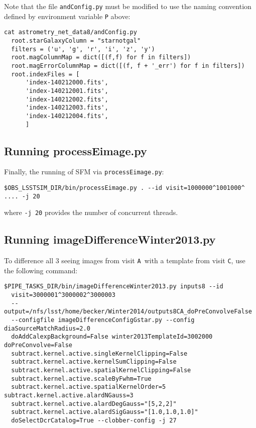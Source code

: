 \documentclass[prd, nofootinbib, floatfix, 11pt, tightenlines, times]{article}
\def\A{{\tt A}}
\def\C{{\tt C}}
\begin{document}
\begin{appendices}
Note that the file {\tt andConfig.py} must be modified to use the
naming convention defined by environment variable {\tt P} above:

{\small
\begin{Verbatim}[frame=single]
cat astrometry_net_data8/andConfig.py 
  root.starGalaxyColumn = "starnotgal"
  filters = ('u', 'g', 'r', 'i', 'z', 'y')
  root.magColumnMap = dict([(f,f) for f in filters])
  root.magErrorColumnMap = dict([(f, f + '_err') for f in filters])
  root.indexFiles = [
      'index-140212000.fits',  
      'index-140212001.fits',  
      'index-140212002.fits',  
      'index-140212003.fits',
      'index-140212004.fits',
      ]
\end{Verbatim}
}

\subsection{Running processEimage.py}

Finally, the running of SFM via {\tt processEimage.py}:

{\small
\begin{Verbatim}[frame=single]
$OBS_LSSTSIM_DIR/bin/processEimage.py . --id visit=1000000^1001000^ .... -j 20
\end{Verbatim}
}
where {\tt -j 20} provides the number of concurrent threads.

\subsection{Running imageDifferenceWinter2013.py}

To difference all 3 seeing images from visit \A\ with a template from visit \C,
use the following command:
{\small
\begin{Verbatim}[frame=single]
$PIPE_TASKS_DIR/bin/imageDifferenceWinter2013.py inputs8 --id 
  visit=3000001^3000002^3000003 
  --output=/nfs/lsst/home/becker/Winter2014/outputs8CA_doPreConvolveFalse 
  --configfile imageDifferenceConfigGstar.py --config diaSourceMatchRadius=2.0 
  doAddCalexpBackground=False winter2013TemplateId=3002000  doPreConvolve=False 
  subtract.kernel.active.singleKernelClipping=False 
  subtract.kernel.active.kernelSumClipping=False 
  subtract.kernel.active.spatialKernelClipping=False 
  subtract.kernel.active.scaleByFwhm=True 
  subtract.kernel.active.spatialKernelOrder=5 subtract.kernel.active.alardNGauss=3 
  subtract.kernel.active.alardDegGauss="[5,2,2]" 
  subtract.kernel.active.alardSigGauss="[1.0,1.0,1.0]" 
  doSelectDcrCatalog=True --clobber-config -j 27 
\end{Verbatim}
}


\end{appendices}
\end{document}

